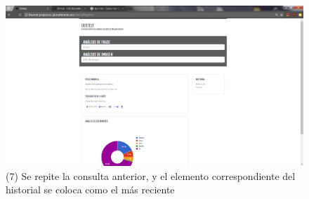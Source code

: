 \documentclass[a4paper]{article}
\begin{document}
\begin{figure}[htp!]
    \centering
    \caption{(7) Se repite la consulta anterior, y el elemento correspondiente del historial se coloca como el más reciente}
    \label{fig:11}
    \includegraphics[width=\textwidth]{g}
\end{figure}
\end{document}
